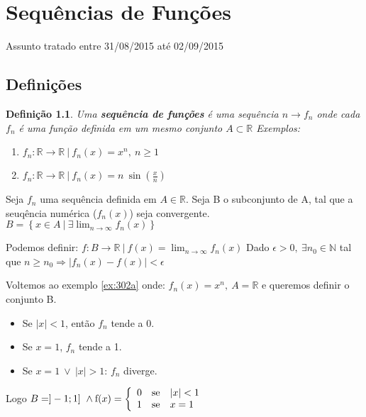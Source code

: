 \documentclass[12pt,openany]{book}
\newtheorem{definition}{Definição}[section]
\begin{document}
\chapter{Sequências de Funções} Assunto tratado entre 31/08/2015 até 02/09/2015
\label{chap:c3}

\section{Definições}

\begin{definition} Uma \textbf{sequência de funções} é uma sequência $n \rightarrow f_n$ onde cada $f_n$ é uma função definida em um mesmo conjunto $A \subset \mathds{R}$ Exemplos: \begin{enumerate}
\item $f_n: \mathds{R} \rightarrow \mathds{R} \ | \ f_n(x) = x^n, \ n \geq 1$ \label{ex:302a}
\item $f_n: \mathds{R} \rightarrow \mathds{R} \ | \ f_n(x) = n\ \displaystyle{\sin \left( \frac{x}{n}\right)}$ \label{ex:302b}
\end{enumerate}
\end{definition}

Seja $f_n$ uma sequência definida em $A \in \mathds{R}$. Seja B o subconjunto de A, tal que a seuqência numérica ($f_n(x)$) seja convergente. $B = \left\{x \in A\ | \ \exists \lim_{n \rightarrow \infty} f_n(x) \right\}$

Podemos definir: $f: B \rightarrow \mathds{R} \ | \ f(x) = \displaystyle{\lim_{n \rightarrow \infty} f_n(x)}$ Dado $\epsilon > 0, \ \exists n_0 \in \mathds{N}$ tal que $n \geq n_0 \Rightarrow |f_n(x) - f(x)| < \epsilon$

Voltemos ao exemplo \ref{ex:302a} onde: $f_n(x) = x^n, \ A = \mathds{R}$ e queremos definir o conjunto B.

\begin{itemize}
\item Se $|x| < 1$, então $f_n$ tende a 0.
\item Se $x=1$, $f_n$ tende a 1.
\item Se $x=1 \ \lor \ |x| > 1$: $f_n$ diverge.
\end{itemize}
Logo $B = ]-1;1]\ \land \hbox{f}(x)
= \left\{ \begin{array}{rll}
0 & \hbox{se} &  |x| < 1 \\
1 & \hbox{se} &  x  = 1 \\
\end{array}\right.$
\end{document}
